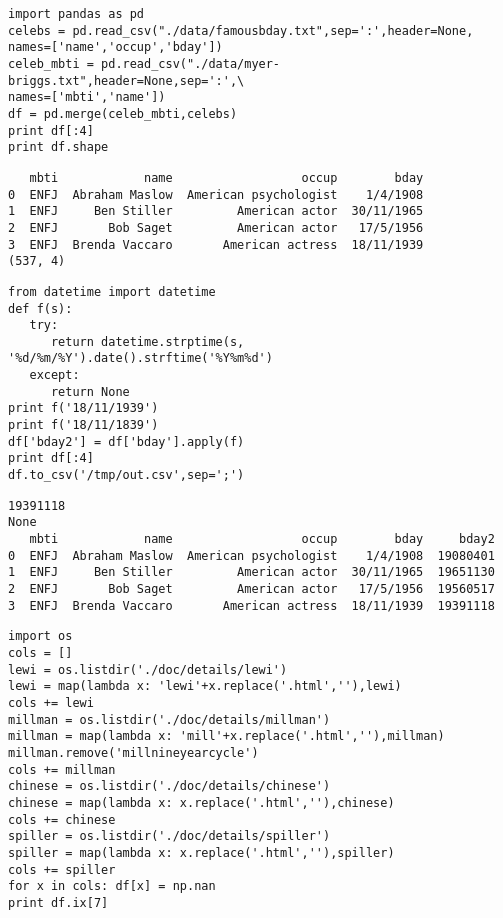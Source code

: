 \documentclass[12pt,fleqn]{article}\usepackage{common}
\begin{document}
\begin{verbatim}
import pandas as pd
celebs = pd.read_csv("./data/famousbday.txt",sep=':',header=None, 
names=['name','occup','bday'])
celeb_mbti = pd.read_csv("./data/myer-briggs.txt",header=None,sep=':',\
names=['mbti','name'])
df = pd.merge(celeb_mbti,celebs)
print df[:4]
print df.shape
\end{verbatim}

\begin{verbatim}
   mbti            name                  occup        bday
0  ENFJ  Abraham Maslow  American psychologist    1/4/1908
1  ENFJ     Ben Stiller         American actor  30/11/1965
2  ENFJ       Bob Saget         American actor   17/5/1956
3  ENFJ  Brenda Vaccaro       American actress  18/11/1939
(537, 4)
\end{verbatim}

\begin{verbatim}
from datetime import datetime
def f(s):
   try:
      return datetime.strptime(s, '%d/%m/%Y').date().strftime('%Y%m%d')
   except: 
      return None
print f('18/11/1939')
print f('18/11/1839')
df['bday2'] = df['bday'].apply(f)
print df[:4]
df.to_csv('/tmp/out.csv',sep=';')
\end{verbatim}

\begin{verbatim}
19391118
None
   mbti            name                  occup        bday     bday2
0  ENFJ  Abraham Maslow  American psychologist    1/4/1908  19080401
1  ENFJ     Ben Stiller         American actor  30/11/1965  19651130
2  ENFJ       Bob Saget         American actor   17/5/1956  19560517
3  ENFJ  Brenda Vaccaro       American actress  18/11/1939  19391118
\end{verbatim}

\begin{verbatim}
import os
cols = []
lewi = os.listdir('./doc/details/lewi')
lewi = map(lambda x: 'lewi'+x.replace('.html',''),lewi)
cols += lewi
millman = os.listdir('./doc/details/millman')
millman = map(lambda x: 'mill'+x.replace('.html',''),millman)
millman.remove('millnineyearcycle')
cols += millman
chinese = os.listdir('./doc/details/chinese')
chinese = map(lambda x: x.replace('.html',''),chinese)
cols += chinese
spiller = os.listdir('./doc/details/spiller')
spiller = map(lambda x: x.replace('.html',''),spiller)
cols += spiller
for x in cols: df[x] = np.nan
print df.ix[7]
\end{verbatim}
\end{document}
